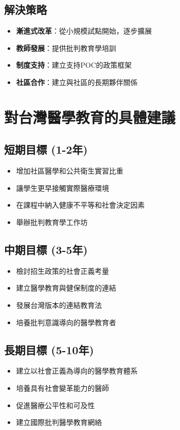 \documentclass[12pt,a4paper]{article}
\begin{document}
\subsection{解決策略}
\begin{itemize}[nosep]
    \item \textbf{漸進式改革}：從小規模試點開始，逐步擴展
    \item \textbf{教師發展}：提供批判教育學培訓
    \item \textbf{制度支持}：建立支持POC的政策框架
    \item \textbf{社區合作}：建立與社區的長期夥伴關係
\end{itemize}

\section{對台灣醫學教育的具體建議}

\subsection{短期目標 (1-2年)}
\begin{itemize}[nosep]
    \item 增加社區醫學和公共衛生實習比重
    \item 讓學生更早接觸實際醫療環境
    \item 在課程中納入健康不平等和社會決定因素
    \item 舉辦批判教育學工作坊
\end{itemize}

\subsection{中期目標 (3-5年)}
\begin{itemize}[nosep]
    \item 檢討招生政策的社會正義考量
    \item 建立醫學教育與健保制度的連結
    \item 發展台灣版本的連結教育法
    \item 培養批判意識導向的醫學教育者
\end{itemize}

\subsection{長期目標 (5-10年)}
\begin{itemize}[nosep]
    \item 建立以社會正義為導向的醫學教育體系
    \item 培養具有社會變革能力的醫師
    \item 促進醫療公平性和可及性
    \item 建立國際批判醫學教育網絡
\end{itemize}
\end{document}
